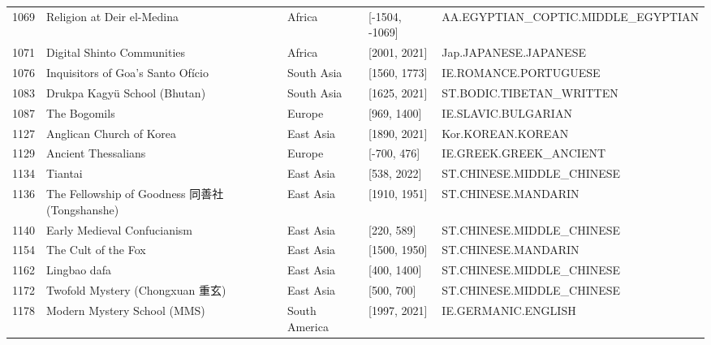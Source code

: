 {\begin{longtable}{rp{3.5cm}llp{3.5cm}}
1069 & {\raggedright Religion at Deir el-Medina} & Africa & [-1504, -1069] & {\raggedright AA.\allowbreak{}EGYPTIAN\_\allowbreak{}COPTIC.\allowbreak{}MIDDLE\_\allowbreak{}EGYPTIAN} \\
1071 & {\raggedright Digital Shinto Communities} & Africa & [2001, 2021] & {\raggedright Jap.\allowbreak{}JAPANESE.\allowbreak{}JAPANESE} \\
1076 & {\raggedright Inquisitors of Goa's Santo Ofício} & South Asia & [1560, 1773] & {\raggedright IE.\allowbreak{}ROMANCE.\allowbreak{}PORTUGUESE} \\
1083 & {\raggedright Drukpa Kagyü School (Bhutan)} & South Asia & [1625, 2021] & {\raggedright ST.\allowbreak{}BODIC.\allowbreak{}TIBETAN\_\allowbreak{}WRITTEN} \\
1087 & {\raggedright The Bogomils} & Europe & [969, 1400] & {\raggedright IE.\allowbreak{}SLAVIC.\allowbreak{}BULGARIAN} \\
1127 & {\raggedright Anglican Church of Korea} & East Asia & [1890, 2021] & {\raggedright Kor.\allowbreak{}KOREAN.\allowbreak{}KOREAN} \\
1129 & {\raggedright Ancient Thessalians} & Europe & [-700, 476] & {\raggedright IE.\allowbreak{}GREEK.\allowbreak{}GREEK\_\allowbreak{}ANCIENT} \\
1134 & {\raggedright Tiantai} & East Asia & [538, 2022] & {\raggedright ST.\allowbreak{}CHINESE.\allowbreak{}MIDDLE\_\allowbreak{}CHINESE} \\
1136 & {\raggedright The Fellowship of Goodness 同善社 (Tongshanshe)} & East Asia & [1910, 1951] & {\raggedright ST.\allowbreak{}CHINESE.\allowbreak{}MANDARIN} \\
1140 & {\raggedright Early Medieval Confucianism} & East Asia & [220, 589] & {\raggedright ST.\allowbreak{}CHINESE.\allowbreak{}MIDDLE\_\allowbreak{}CHINESE} \\
1154 & {\raggedright The Cult of the Fox} & East Asia & [1500, 1950] & {\raggedright ST.\allowbreak{}CHINESE.\allowbreak{}MANDARIN} \\
1162 & {\raggedright Lingbao dafa} & East Asia & [400, 1400] & {\raggedright ST.\allowbreak{}CHINESE.\allowbreak{}MIDDLE\_\allowbreak{}CHINESE} \\
1172 & {\raggedright Twofold Mystery (Chongxuan 重玄)} & East Asia & [500, 700] & {\raggedright ST.\allowbreak{}CHINESE.\allowbreak{}MIDDLE\_\allowbreak{}CHINESE} \\
1178 & {\raggedright Modern Mystery School (MMS)} & South America & [1997, 2021] & {\raggedright IE.\allowbreak{}GERMANIC.\allowbreak{}ENGLISH} \\

\end{longtable}}
